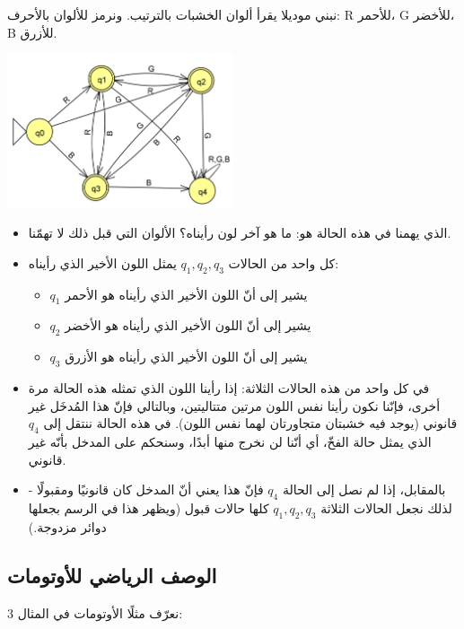 \documentclass[12pt]{article}
\begin{document}
نبني موديلا يقرأ ألوان الخشبات بالترتيب. ونرمز للألوان بالأحرف: R للأحمر، G للأخضر، B للأزرق.

\begin{center}
\includegraphics[width=0.5\textwidth]{../../../images/DFAs/03_color_series_dfa.png}
\end{center}

\begin{itemize}
    \item الذي يهمنا في هذه الحالة هو: ما هو آخر لون رأيناه؟ الألوان التي قبل ذلك لا تهمّنا.
    \item كل واحد من الحالات $q_1, q_2, q_3$ يمثل اللون الأخير الذي رأيناه:
    \begin{itemize}
        \item $q_1$ يشير إلى أنّ اللون الأخير الذي رأيناه هو الأحمر
        \item $q_2$ يشير إلى أنّ اللون الأخير الذي رأيناه هو الأخضر
        \item $q_3$ يشير إلى أنّ اللون الأخير الذي رأيناه هو الأزرق
    \end{itemize}
    \item في كل واحد من هذه الحالات الثلاثة: إذا رأينا اللون الذي تمثله هذه الحالة مرة أخرى، فإنّنا نكون رأينا نفس اللون مرتين متتاليتين، وبالتالي فإنّ هذا المُدخَل غير قانوني (يوجد فيه خشبتان متجاورتان لهما نفس اللون).
    في هذه الحالة ننتقل إلى $q_4$ الذي يمثل حالة الفخّ، أي أنّنا لن نخرج منها أبدًا، وسنحكم على المدخل بأنّه غير قانوني.
    \item بالمقابل، إذا لم نصل إلى الحالة $q_4$ فإنّ هذا يعني أنّ المدخل كان قانونيًا ومقبولًا - لذلك نجعل الحالات الثلاثة $q_1, q_2, q_3$ كلها حالات قبول (ويظهر هذا في الرسم بجعلها دوائر مزدوجة.)
\end{itemize}


\subsection{الوصف الرياضي للأوتومات}

نعرّف مثلًا الأوتومات في المثال 3:
\end{document}
